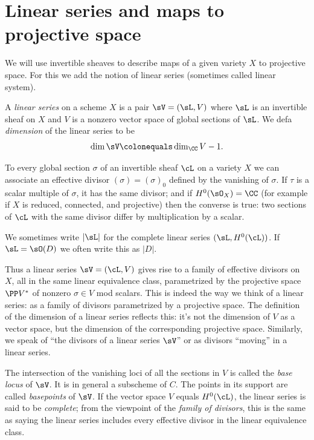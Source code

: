 \section{Linear series and maps to projective space}

We will use invertible sheaves to  describe maps of a given variety $X$ to projective space. For this we add the notion of linear series (sometimes called linear system).
%

\begin{definition}
 A \emph{linear series} on a scheme $X$ is a pair $\sV  = (\sL, V)$ where $\sL$ is an invertible sheaf  on $X$ and
 $V$ is a nonzero vector space of global sections of $\sL$. We defa
\emph{dimension}
%
of the linear series to be
 $$
 \dim \sV \colonequals \dim_\CC V -1.
 $$
  \end{definition}

To every global section $\sigma$ of an invertible sheaf $\cL$ on a variety $X$  we can associate an effective divisor $(\sigma) = (\sigma)_0$ defined by the vanishing of $\sigma$. If $\tau$ is a scalar multiple of $\sigma$, it has the same divisor; and if
 $H^0(\sO_X) = \CC$ (for example if $X$ is reduced, connected, and
 projective) then the converse is true: two sections of $\cL$ with the same divisor differ by multiplication by a scalar.

 We sometimes write
 $|\sL|$ for the complete linear series $(\sL, H^0(\cL))$. If
$\sL = \sO(D)$
%
 we often write this as $|D|$.

Thus a linear series $\sV = (\cL, V)$ gives rise to a family of
effective divisors on $X$, all in the same linear equivalence class,
parametrized by the projective space $\PP V^*$
of nonzero $\sigma \in V$ mod scalars.
This is indeed the way
we think of a linear series: as a family of divisors parametrized by a
projective space.
The definition of the dimension
of a linear series
reflects this:
it's not the dimension of $V$ as a vector
space, but the dimension of the corresponding projective space.
Similarly, we speak
 of ``the divisors of
a linear series $\sV$'' or as divisors ``moving'' in a linear series.

The intersection of the vanishing loci of all the sections in $V$ is
%
called the \emph{base locus} of $\sV$. It is in general a subscheme of
$C$. The points in its support are called \emph{basepoints} of $\sV$.
If the vector space $V$ equals $H^0(\cL)$, the linear series is said to be
%
%
\emph{complete};
from the viewpoint
of the \emph{family of divisors},
%
this is the same as saying the linear series includes every
effective divisor in the linear equivalence class.

